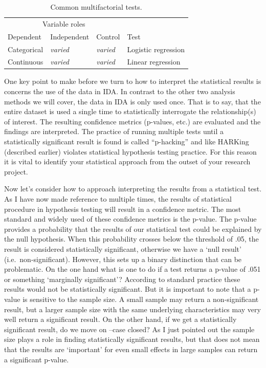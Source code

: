 \documentclass[
]{article}
\begin{document}
\begin{table}

\caption{\label{tab:ida-statistical-multifactorial-listing}Common multifactorial tests.}
\centering
\begin{tabular}[t]{l>{}l>{}ll}
\toprule
\multicolumn{3}{c}{Variable roles} & \multicolumn{1}{c}{ } \\
\cmidrule(l{3pt}r{3pt}){1-3}
Dependent & Independent & Control & Test\\
\midrule
Categorical & \em{varied} & \em{varied} & Logistic regression\\
Continuous & \em{varied} & \em{varied} & Linear regression\\
\bottomrule
\end{tabular}
\end{table}

One key point to make before we turn to how to interpret the statistical results is concerns the use of the data in IDA. In contrast to the other two analysis methods we will cover, the data in IDA is only used once. That is to say, that the entire dataset is used a single time to statistically interrogate the relationship(s) of interest. The resulting confidence metrics (p-values, etc.) are evaluated and the findings are interpreted. The practice of running multiple tests until a statistically significant result is found is called ``p-hacking'' \citep{Head2015} and like HARKing (described earlier) violates statistical hypothesis testing practice. For this reason it is vital to identify your statistical approach from the outset of your research project.

Now let's consider how to approach interpreting the results from a statistical test. As I have now made reference to multiple times, the results of statistical procedure in hypothesis testing will result in a confidence metric. The most standard and widely used of these confidence metrics is the p-value. The p-value provides a probability that the results of our statistical test could be explained by the null hypothesis. When this probability crosses below the threshold of .05, the result is considered statistically significant, otherwise we have a `null result' (i.e.~non-significant). However, this sets up a binary distinction that can be problematic. On the one hand what is one to do if a test returns a p-value of .051 or something `marginally significant'? According to standard practice these results would not be statistically significant. But it is important to note that a p-value is sensitive to the sample size. A small sample may return a non-significant result, but a larger sample size with the same underlying characteristics may very well return a significant result. On the other hand, if we get a statistically significant result, do we move on --case closed? As I just pointed out the sample size plays a role in finding statistically significant results, but that does not mean that the results are `important' for even small effects in large samples can return a significant p-value.
\end{document}
